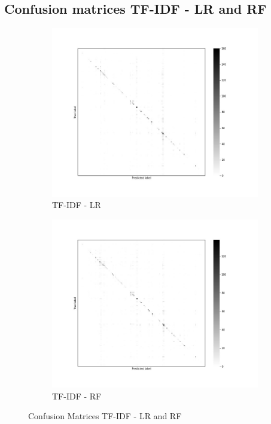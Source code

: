 \documentclass[12pt, a4paper, titlepage]{article}
\begin{document}
\subsection*{Confusion matrices TF-IDF - LR and RF}
\begin{figure}[hb!]
  \centering
  \begin{subfigure}[b]{0.475\textwidth}  
    \centering 
    \includegraphics[width=\textwidth]{cm_tfidf_LR.jpg}
    {{\small TF-IDF - LR}}    
  \end{subfigure}
  \hfill
  \begin{subfigure}[b]{0.475\textwidth}   
      \centering 
      \includegraphics[width=\textwidth]{cm_tfidf_RF.jpg}
      {{\small TF-IDF - RF}}    
  \end{subfigure}  
  \caption{\label{fig: F24} Confusion Matrices TF-IDF - LR and RF}
\end{figure}
\end{document}
